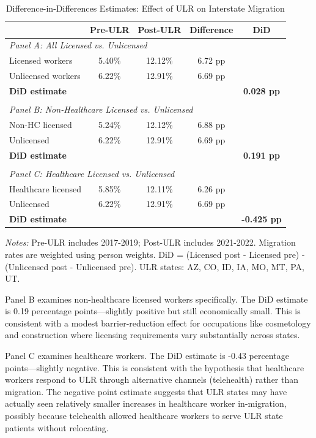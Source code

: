 \documentclass[12pt]{article}
\begin{document}
\begin{table}[H]
\centering
\caption{Difference-in-Differences Estimates: Effect of ULR on Interstate Migration}
\begin{tabular}{lcccc}
\toprule
& Pre-ULR & Post-ULR & Difference & DiD \\
\midrule
\multicolumn{5}{l}{\textit{Panel A: All Licensed vs. Unlicensed}} \\
Licensed workers & 5.40\% & 12.12\% & 6.72 pp & \\
Unlicensed workers & 6.22\% & 12.91\% & 6.69 pp & \\
\textbf{DiD estimate} & & & & \textbf{0.028 pp} \\
\\
\multicolumn{5}{l}{\textit{Panel B: Non-Healthcare Licensed vs. Unlicensed}} \\
Non-HC licensed & 5.24\% & 12.12\% & 6.88 pp & \\
Unlicensed & 6.22\% & 12.91\% & 6.69 pp & \\
\textbf{DiD estimate} & & & & \textbf{0.191 pp} \\
\\
\multicolumn{5}{l}{\textit{Panel C: Healthcare Licensed vs. Unlicensed}} \\
Healthcare licensed & 5.85\% & 12.11\% & 6.26 pp & \\
Unlicensed & 6.22\% & 12.91\% & 6.69 pp & \\
\textbf{DiD estimate} & & & & \textbf{-0.425 pp} \\
\bottomrule
\end{tabular}

\vspace{0.5em}
\footnotesize
\textit{Notes:} Pre-ULR includes 2017-2019; Post-ULR includes 2021-2022. Migration rates are weighted using person weights. DiD = (Licensed post - Licensed pre) - (Unlicensed post - Unlicensed pre). ULR states: AZ, CO, ID, IA, MO, MT, PA, UT.
\label{tab:main}
\end{table}

Panel B examines non-healthcare licensed workers specifically. The DiD estimate is 0.19 percentage points---slightly positive but still economically small. This is consistent with a modest barrier-reduction effect for occupations like cosmetology and construction where licensing requirements vary substantially across states.

Panel C examines healthcare workers. The DiD estimate is -0.43 percentage points---slightly negative. This is consistent with the hypothesis that healthcare workers respond to ULR through alternative channels (telehealth) rather than migration. The negative point estimate suggests that ULR states may have actually seen relatively smaller increases in healthcare worker in-migration, possibly because telehealth allowed healthcare workers to serve ULR state patients without relocating.
\end{document}
